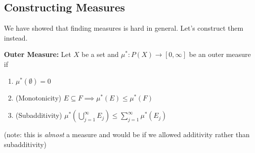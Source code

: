 \documentclass[12pt]{report}
\newcommand{\sub}{\subseteq}
\begin{document}
    \subsection*{Constructing Measures}
        We have showed that finding measures is hard in general. Let's construct them instead. 

        \textbf{Outer Measure:} Let $X$ be a set and $\mu^*: P(X) \to [0, \infty]$ be an outer measure if
        \begin{enumerate}
            \item $\mu^*(\emptyset) = 0$
            \item (Monotonicity) $E \sub F \implies \mu^*(E) \leq \mu^*(F)$
            \item (Subadditivity) $\mu^*\left(\bigcup_{j=1}^{\infty} E_j\right) \leq \sum_{j=1}^{\infty} \mu^*(E_j)$
        \end{enumerate}
        (note: this is \emph{almost} a measure and would be if we allowed additivity rather than subadditivity)
\end{document}
